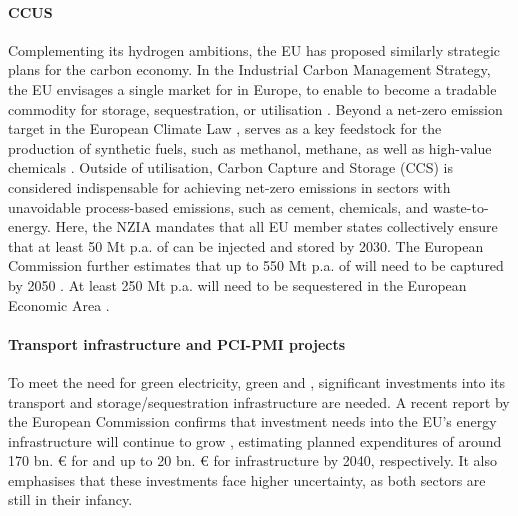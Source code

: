 \documentclass[final,5p,times,twocolumn,sort&compress]{elsarticle}
\begin{document}
\paragraph{CCUS}
Complementing its hydrogen ambitions, the EU has proposed similarly strategic plans for the carbon economy. In the Industrial Carbon Management Strategy, the EU envisages a single market for  in Europe, to enable  to become a tradable commodity for storage, sequestration, or utilisation \cite{europeancourtofauditorsEUsIndustrialPolicy2024}. Beyond a net-zero emission target in the European Climate Law \cite{europeanparliamentRegulationEU20212021},  serves as a key feedstock for the production of synthetic fuels, such as methanol, methane, as well as high-value chemicals \cite{neumannPotentialRoleHydrogen2023}. Outside of  utilisation, Carbon Capture and Storage (CCS) is considered indispensable for achieving net-zero emissions in sectors with unavoidable process-based  emissions, such as cement, chemicals, and waste-to-energy. Here, the NZIA mandates that all EU member states collectively ensure that at least 50 Mt p.a. of  can be injected and stored by 2030. The European Commission further estimates that up to 550 Mt p.a. of  will need to be captured by 2050 \cite{europeanparliamentRegulationEU20242024}. At least 250 Mt p.a. will need to be sequestered in the European Economic Area \cite{europeancommissionCommunicationCommissionEuropean2024}.

\paragraph{Transport infrastructure and PCI-PMI projects}
To meet the need for green electricity, green  and , significant investments into its transport and storage/sequestration infrastructure are needed. A recent report by the European Commission confirms that investment needs into the EU's energy infrastructure will continue to grow \cite{europeancommission.directorategeneralforenergy.InvestmentNeedsEuropean2025}, estimating planned expenditures of around 170 bn. \euro{} for  and up to 20 bn. \euro{} for  infrastructure by 2040, respectively. It also emphasises that these investments face higher uncertainty, as both sectors are still in their infancy. 
\end{document}
